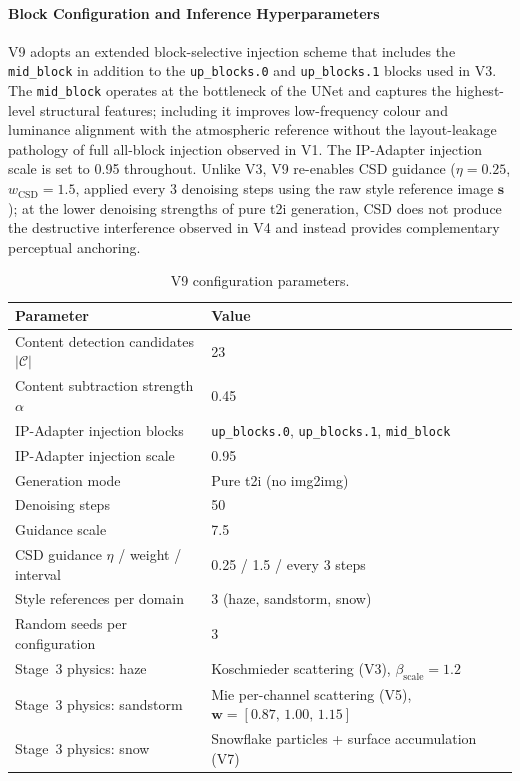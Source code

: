 \paragraph{Block Configuration and Inference Hyperparameters}
V9 adopts an extended block-selective injection scheme that includes the \texttt{mid\_block} in addition to the \texttt{up\_blocks.0} and \texttt{up\_blocks.1} blocks used in V3. The \texttt{mid\_block} operates at the bottleneck of the UNet and captures the highest-level structural features; including it improves low-frequency colour and luminance alignment with the atmospheric reference without the layout-leakage pathology of full all-block injection observed in V1. The IP-Adapter injection scale is set to 0.95 throughout. Unlike V3, V9 re-enables CSD guidance ($\eta=0.25$, $w_\mathrm{CSD}=1.5$, applied every 3 denoising steps using the raw style reference image $\mathbf{s}$); at the lower denoising strengths of pure t2i generation, CSD does not produce the destructive interference observed in V4 and instead provides complementary perceptual anchoring.

\begin{table}[htbp]
\centering
\caption{V9 configuration parameters.}
\label{tab:v9_config}
\begin{tabular}{ll}
\toprule
\textbf{Parameter} & \textbf{Value} \\
\midrule
Content detection candidates $|\mathcal{C}|$ & 23 \\
Content subtraction strength $\alpha$ & 0.45 \\
IP-Adapter injection blocks & \texttt{up\_blocks.0}, \texttt{up\_blocks.1}, \texttt{mid\_block} \\
IP-Adapter injection scale & 0.95 \\
Generation mode & Pure t2i (no img2img) \\
Denoising steps & 50 \\
Guidance scale & 7.5 \\
CSD guidance $\eta$ / weight / interval & 0.25 / 1.5 / every 3 steps \\
Style references per domain & 3 (haze, sandstorm, snow) \\
Random seeds per configuration & 3 \\
Stage~3 physics: haze & Koschmieder scattering (V3), $\beta_\mathrm{scale}=1.2$ \\
Stage~3 physics: sandstorm & Mie per-channel scattering (V5), $\mathbf{w}=[0.87,\,1.00,\,1.15]$ \\
Stage~3 physics: snow & Snowflake particles + surface accumulation (V7) \\
\bottomrule
\end{tabular}
\end{table}

